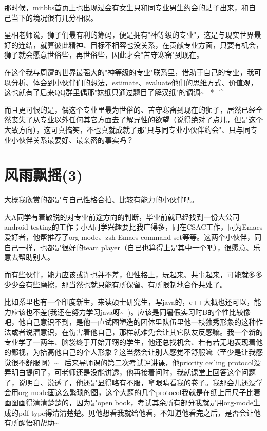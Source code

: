 \documentclass[12pt]{book}
\begin{document}
那时候，mitbbs首页上也出现过会有女生只和同专业男生约会的贴子出来，和自己当下的境况很有几分相似。

星相老师说，狮子们最有利的筹码，便是拥有"神等级的专业"，这是与现实世界最好的连结，就算彼此精神、目标不相容也没关系，在贡献专业方面，只要有机会，狮子就会愿意世俗些，再世俗些，因此才会"苦守寒窑"到现在。

在这个我与周遭的世界最强大的"神等级的专业"联系里，借助于自己的专业，我可以分析、体会到小伙伴们的想法，estimate、evaluate他们的思维方式、价值观，这也就有了后来QQ群里偶那"妹纸只通过题目了解汉纸"的调调\textasciitilde{}~  *\_\^{} 

而且更可恨的是，偶这个专业里最为世俗的、苦守寒窑到现在的狮子，居然已经全然丧失了从专业以外任何其它方面去了解异性的欲望（说得绝对了点儿，但是这个大致方向），这可真搞笑，不也真就成就了那"只与同专业小伙伴约会"、只与同专业小伙伴关系最要好、最亲密的事实吗？

\section{风雨飘摇(3)}
\label{sec-33-3}

大概我欣赏的都是与自己性格合拍、比较有能力的小伙伴吧。

大A同学有着敏锐的对专业前途方向的判断，毕业前就已经找到一份大公司android testing的工作；小A同学兴趣要比我广得多，同在CSAC工作，同为Emacs爱好者，他帮推荐了org-mode、zsh Emacs command set等等。这两个小伙伴，同自己一样，也都是很好的team player（自已也算得上是其中一个吧），很愿意、乐意去帮助别人。

而有些伙伴，能力应该或许也并不差，但性格上，玩起来、共事起来，可能就多多少少会有些磨擦，那当然也就只能有所保留、有所限制地合作共处了。

比如系里也有一个印度新生，来读硕士研究生，写java的，c++大概也还可以，能力应该也不差(我还在努力学习java呀\textasciitilde{}~)。应该是同暑假实习时B的个性比较像吧，他自己意识不到，是他一直试图塑造的团体里队伍里他一枝独秀形象的这种作法或者说潜意识，在伤害着他自己，那样就难免会让其它队友反感嘛。我一个新的专业学了一两年、脑袋终于开始开窃的学生，他还总找机会、若有若无地表现着他的鄙视，为抬高他自己的个人形象？这当然会让别人感觉不舒服嘛（至少是让我感觉很不舒服啊）\textasciitilde{}~ 后来导师课的第二次考试评讲课，他priority ceiling protocol没弄明白提问了，可老师还是没能讲透，他再接着问时，我就课堂上回答这个问题了，说明白、说透了，他还是显得略有不服，拿眼睛看我的卷子。我那会儿还没学会用org-mode画这么繁琐的图，这个大题的几个protocol我就是在纸上用尺子比着画图画得清清楚楚的，因为是open book，考试其余所有部分我就是用org-mode生成的pdf type得清清楚楚。见他想看我就给他看，不知道他看完之后，是否会让他有所醒悟和帮助\textasciitilde{}~
\end{document}
